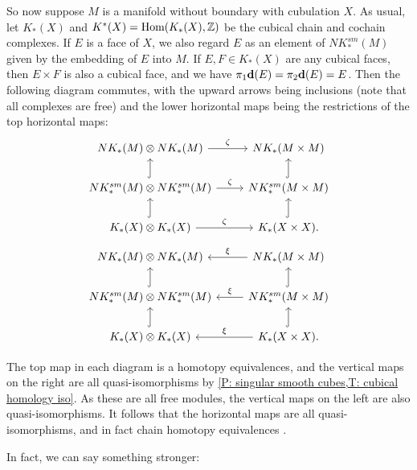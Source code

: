 So now suppose $M$ is a manifold without boundary with cubulation $X$.
As usual, let $K_*(X)$ and $K^*(X) = \textup{Hom}(K_*(X),\mathbb{Z})$ be the cubical chain and cochain complexes.
If $E$ is a face of $X$, we also regard $E$ as an element of $NK^{sm}_*(M)$ given by the embedding of $E$ into $M$.
If $E, F \in K_*(X)$ are any cubical faces, then $E \times F$ is also a cubical face, and  we have $\pi_1\mathbf{d}(E) = \pi_2\mathbf{d}(E) = E$.
Then the following diagram commutes, with the upward arrows being inclusions (note that all complexes are free) and the lower horizontal maps being the restrictions of the top horizontal maps:
\[
\begin{tikzcd}
	NK_*(M) \otimes NK_*(M) \arrow{r}{\zeta} & NK_*(M \times M) \\
	NK^{sm}_*(M) \otimes NK^{sm}_*(M) \arrow{r}{\zeta} \arrow[u, hook] & NK^{sm}_*(M \times M) \arrow[u, hook] \\
	K_*(X) \otimes K_*(X) \arrow{r}{\zeta} \arrow[u, hook] & K_*(X \times X). \arrow[u, hook]
\end{tikzcd}
\]
\begin{equation}\label{E: cube products}
\begin{tikzcd}
	NK_*(M) \otimes NK_*(M) & \arrow[l, "\xi"'] NK_*(M \times M) \\
	NK^{sm}_*(M) \otimes NK^{sm}_*(M) \arrow[u, hook] & \arrow[l, "\xi"'] NK^{sm}_*(M \times M) \arrow[u, hook] \\
	K_*(X) \otimes K_*(X) \arrow[u, hook] & \arrow[l, "\xi"'] K_*(X \times X). \arrow[u, hook]
\end{tikzcd}
\end{equation}

The top map in each diagram is a homotopy equivalences, and the vertical maps on the right are all quasi-isomorphisms by \cref{P: singular smooth cubes,T: cubical homology iso}.
As these are all free modules, the vertical maps on the left are also quasi-isomorphisms.
It follows that the horizontal maps are all quasi-isomorphisms, and in fact chain homotopy equivalences \cite[Theorem 46.2]{Mun84}.

In fact, we can say something stronger:

